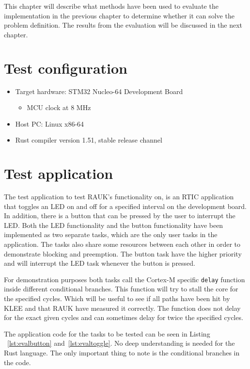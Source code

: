 This chapter will describe what methods have been used to evaluate the
implementation in the previous chapter to determine whether it can solve the
problem definition. The results from the evaluation will be discussed in
the next chapter.

\section{Test configuration}
\begin{itemize}
    \item Target hardware: STM32 Nucleo-64 Development Board
    \begin{itemize}
       \item MCU clock at 8 MHz
    \end{itemize}
    \item Host PC\@: Linux x86-64 
    \item Rust compiler version 1.51, stable release channel
\end{itemize}

\section{Test application}
The test application to test RAUK's functionality on, is an RTIC application
that toggles an LED on and off for a specified interval on the development board. In
addition, there is a button that can be pressed by the user to interrupt the
LED\@. Both the LED functionality and the button functionality have been
implemented as two separate tasks, which are the only user tasks in the
application. The tasks also share some resources between each other in order to
demonstrate blocking and preemption. The button task have the higher priority
and will interrupt the LED task whenever the button is pressed.

For demonstration purposes both tasks call the Cortex-M specific
\texttt{delay} function inside different conditional branches. This function
will try to stall the core for the specified cycles. Which will be useful to
see if all paths have been hit by KLEE and that RAUK have measured it correctly.
The function does not delay for the exact given cycles and can sometimes delay
for twice the specified cycles.

The application code for the tasks to be tested can be seen in Listing
~\ref{lst:evalbutton} and~\ref{lst:evaltoggle}. No deep understanding is
needed for the Rust language. The only important thing to note is the
conditional branches in the code.


